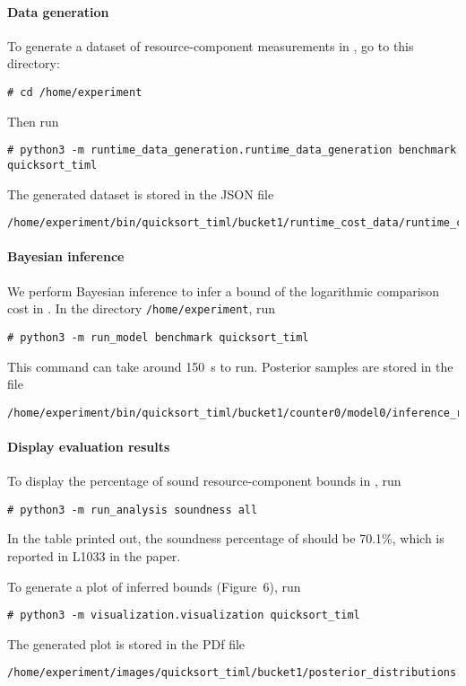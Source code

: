 \paragraph{Data generation}

To generate a dataset of resource-component measurements in \quicksorttiml{},
go to this directory:
\begin{verbatim}
# cd /home/experiment
\end{verbatim}
%
Then run
\begin{verbatim}
# python3 -m runtime_data_generation.runtime_data_generation benchmark quicksort_timl
\end{verbatim}
%
The generated dataset is stored in the JSON file
\begin{verbatim}
/home/experiment/bin/quicksort_timl/bucket1/runtime_cost_data/runtime_cost_data.json
\end{verbatim}

\paragraph{Bayesian inference}

We perform Bayesian inference to infer a bound of the logarithmic comparison cost in \quicksorttiml{}.
%
In the directory \texttt{/home/experiment}, run
\begin{verbatim}
# python3 -m run_model benchmark quicksort_timl
\end{verbatim}
%
This command can take around \qty{150}{\second} to run.
%
Posterior samples are stored in the file
\begin{verbatim}
/home/experiment/bin/quicksort_timl/bucket1/counter0/model0/inference_result.json
\end{verbatim}

\paragraph{Display evaluation results}

To display the percentage of sound resource-component bounds in
\quicksorttiml{}, run
\begin{verbatim}
# python3 -m run_analysis soundness all
\end{verbatim}
%
In the table printed out, the soundness percentage of \quicksorttiml{} should be
70.1\%, which is reported in L1033 in the paper.

To generate a plot of inferred bounds (Figure~6), run
\begin{verbatim}
# python3 -m visualization.visualization quicksort_timl
\end{verbatim}
%
The generated plot is stored in the PDf file
\begin{verbatim}
/home/experiment/images/quicksort_timl/bucket1/posterior_distributions.pdf
\end{verbatim}
